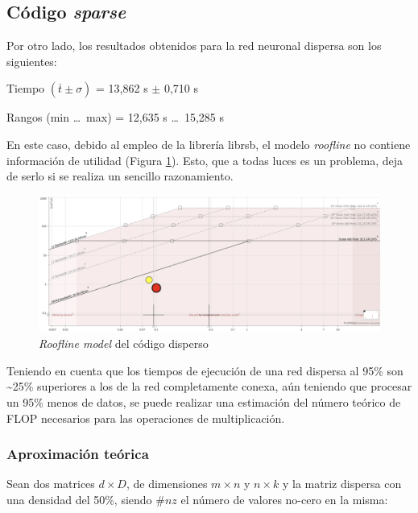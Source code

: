 \subsection{Código \textit{sparse}}
Por otro lado, los resultados obtenidos para la red neuronal dispersa son los siguientes:

\begin{center}
Tiempo $(\overline{t} \pm \sigma)$ = 13,862 s $\pm$ 0,710 s

Rangos (min \ldots\ max) = 12,635 s \ldots\ 15,285 s
\end{center}

En este caso, debido al empleo de la librería librsb, el modelo \textit{roofline} no contiene información de utilidad (Figura \ref{fig:roofline_sparse_details}). Esto, que a todas luces es un problema, deja de serlo si se realiza un sencillo razonamiento.

\begin{figure}[h!]
    \centering
    \includegraphics[width=\textwidth]{img/roofline_sparse.png}
    \caption{\textit{Roofline model} del código disperso}
    \label{fig:roofline_sparse_details}
\end{figure}

Teniendo en cuenta que los tiempos de ejecución de una red dispersa al 95\% son \textasciitilde25\% superiores a los de la red completamente conexa, aún teniendo que procesar un 95\% menos de datos, se puede realizar una estimación del número teórico de FLOP necesarios para las operaciones de multiplicación.

\subsubsection{Aproximación teórica}
Sean dos matrices $d \times D$, de dimensiones $m \times n$ y $n \times k$ y la matriz dispersa con una densidad del 50\%, siendo $\#nz$ el número de valores no-cero en la misma:

